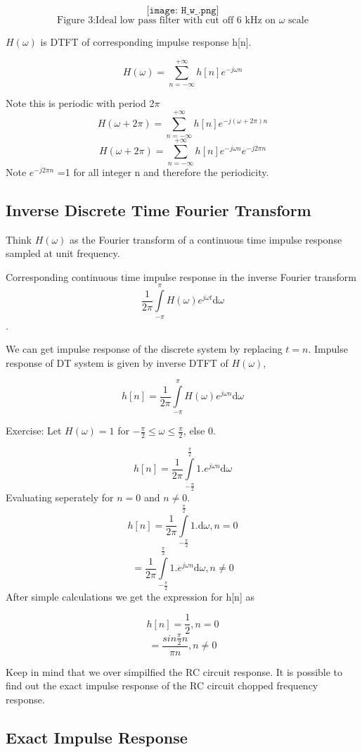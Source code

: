 $$\texttt{[image: H\_w\_.png]}$$
$$\mbox{Figure 3:Ideal low pass filter with cut off 6 kHz on $\omega$ scale}$$

    $H(\omega)$ is DTFT of corresponding impulse response h[n].
    
    $$H(\omega)= \sum\limits_{n=-\infty}^{+\infty} h[n] e^{-j\omega n}$$
    
Note this is periodic with period 2$\pi$
$$H(\omega + 2\pi) = \sum\limits_{n=-\infty}^{+\infty} h[n]e^{-j(\omega+2\pi)n}$$
     $$H(\omega + 2\pi) = \sum\limits_{n=-\infty}^{+\infty} h[n]e^{-j\omega n}e^{-j2\pi n}$$
    Note $e^{-j2\pi n}$ =1 for all integer n and therefore the periodicity.
\subsection{Inverse Discrete Time Fourier Transform }


Think $H(\omega)$ as the Fourier transform of a continuous time impulse response sampled at unit frequency.

 Corresponding continuous time impulse response in the inverse Fourier transform  
 $$\frac{1}{2\pi} \int\limits_{-\pi}^{\pi} H(\omega)e^{j\omega t} \mbox{d$\omega$}$$.
 
We can get impulse response of the discrete system by replacing $t=n$.
Impulse response of DT system is given by inverse DTFT of $H(\omega)$,


$$h[n]=\frac{1}{2\pi}\int\limits_{-\pi}^{\pi} H(\omega) e^{j\omega n}\mbox{d$\omega$}$$

Exercise: 
Let $H(\omega) = 1$ for $-\frac{\pi}{2} \leq \omega \leq \frac{\pi}{2}$, else 0.

$$h[n] =\frac{1}{2\pi}\int\limits_{-\frac{\pi}{2}}^{\frac{\pi}{2}} 1.e^{j\omega n}\mbox{d$\omega$}$$
Evaluating seperately for $n=0$ and $n \neq 0$.
$$h[n]=\frac{1}{2\pi}\int\limits_{-\frac{\pi}{2}}^{\frac{\pi}{2}}1.\mbox{d$\omega$} , n=0 $$
$$=\frac{1}{2\pi}\int\limits_{-\frac{\pi}{2}}^{\frac{\pi}{2}}1.e^{j\omega n}\mbox{d$\omega$} , n\neq 0$$
After simple calculations we get the expression for h[n] as

$$h[n]=\frac{1}{2}, n=0$$
       $$=\frac{sin\frac{\pi}{2} n}{\pi n},n \neq 0$$
      

Keep in mind that we over simpilfied the RC circuit response. It is possible to find out the exact impulse response of the RC circuit chopped frequency response.

\subsection{Exact Impulse Response}

